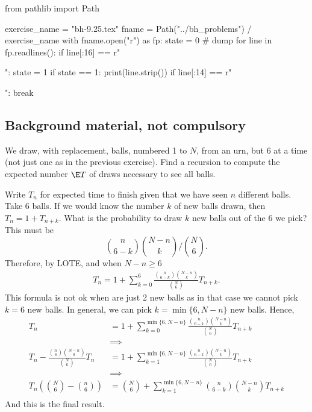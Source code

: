 \begin{pycode}
from pathlib import Path

exercise_name = "bh-9.25.tex"
fname = Path("../bh_problems") / exercise_name
with fname.open("r") as fp:
    state = 0  # dump
    for line in fp.readlines():
        if line[:16] == r"\begin{exercise}":
            state = 1
        if state == 1:
            print(line.strip())
        if line[:14] == r"\end{exercise}":
            break
\end{pycode}

\subsection{Background material, not compulsory}

\begin{exercise}
We draw, with replacement, balls, numbered 1 to $N$, from an urn, but 6 at a time (not just one as in the previous exercise).
Find a recursion to compute the expected number $\E T$ of draws necessary to see all balls.
\begin{solution}
  Write $T_{n}$ for expected time to finish given that we have seen $n$ different balls.
  Take 6 balls.
  If we would know the number $k$ of new balls drawn, then $T_{n} = 1 + T_{n+k}$.
  What is the probability to draw $k$ new balls  out of the 6 we pick?
  This must be
\begin{equation}
\label{eq:930}
{n \choose 6-k}{N-n \choose k}\big/{N \choose 6}.
\end{equation}
Therefore, by LOTE, and when $N-n\geq 6$
\begin{align}
T_{n} = 1 + \sum_{k=0}^{6} \frac{{n \choose 6-k}{N-n \choose k}}{{N \choose 6}} T_{n+k}.
\end{align}
This formula is not ok when are just 2 new balls as in that case we cannot pick $k=6$ new balls. In general, we can pick $k=\min\{6, N-n\}$ new balls. Hence,
\begin{align}
T_{n}
&=
1 + \sum_{k=0}^{\min\{6, N-n\}} \frac{{n \choose 6-k}{N-n \choose k}}{{N \choose 6}} T_{n+k} \\
&\implies \\
T_{n} - \frac{{n \choose 6}{N-n \choose 0}}{{N \choose 6}} T_{n}
&=1 + \sum_{k=1}^{\min\{6, N-n\}} \frac{{n \choose 6-k}{N-n \choose k}}{{N \choose 6}} T_{n+k} \\
&\implies \\
T_{n}\left( {N\choose 6}  -{n \choose 6} \right)
&={N\choose 6} + \sum_{k=1}^{\min\{6, N-n\}}{n \choose 6-k}{N-n \choose k} T_{n+k} \\
\end{align}
And this is the final result.

\end{solution}
\end{exercise}

